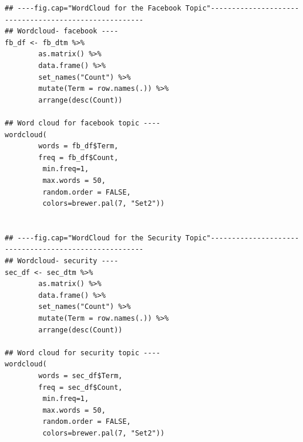 \documentclass[
]{article}
\begin{document}
\begin{verbatim}
## ----fig.cap="WordCloud for the Facebook Topic"------------------------------------------------------
## Wordcloud- facebook ----
fb_df <- fb_dtm %>% 
        as.matrix() %>% 
        data.frame() %>% 
        set_names("Count") %>% 
        mutate(Term = row.names(.)) %>% 
        arrange(desc(Count))

## Word cloud for facebook topic ----
wordcloud(
        words = fb_df$Term,
        freq = fb_df$Count,
         min.freq=1, 
         max.words = 50, 
         random.order = FALSE, 
         colors=brewer.pal(7, "Set2")) 


## ----fig.cap="WordCloud for the Security Topic"------------------------------------------------------
## Wordcloud- security ----
sec_df <- sec_dtm %>% 
        as.matrix() %>% 
        data.frame() %>% 
        set_names("Count") %>% 
        mutate(Term = row.names(.)) %>% 
        arrange(desc(Count))

## Word cloud for security topic ----
wordcloud(
        words = sec_df$Term,
        freq = sec_df$Count,
         min.freq=1, 
         max.words = 50, 
         random.order = FALSE, 
         colors=brewer.pal(7, "Set2")) 




\end{verbatim}
\end{document}
